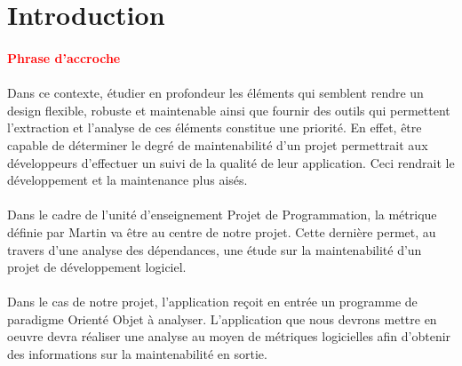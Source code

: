 \documentclass{scrartcl}
\begin{document}
\tableofcontents
\pagebreak











\section{Introduction}
    
    \paragraph{\textcolor{red}{Phrase d'accroche}}

    \paragraph{}Dans ce contexte, étudier en profondeur les éléments qui semblent rendre un design flexible, robuste et maintenable ainsi que fournir des outils qui permettent l'extraction et l'analyse de ces éléments constitue une priorité. En effet, être capable de déterminer le degré de maintenabilité d'un projet permettrait aux développeurs d'effectuer un suivi de la qualité de leur application. Ceci rendrait le développement et la maintenance plus aisés.

    \paragraph{}Dans le cadre de l'unité d'enseignement \og Projet de Programmation\fg, la métrique définie par Martin\cite{Martin:1994} va être au centre de notre projet. Cette dernière permet, au travers d'une analyse des dépendances, une étude sur la maintenabilité d'un projet de développement logiciel.

    \paragraph{}Dans le cas de notre projet, l'application reçoit en entrée un programme de paradigme Orienté Objet à analyser. L'application que nous devrons mettre en oeuvre devra réaliser une analyse au moyen de métriques logicielles afin d'obtenir des informations sur la maintenabilité en sortie.
\end{document}
